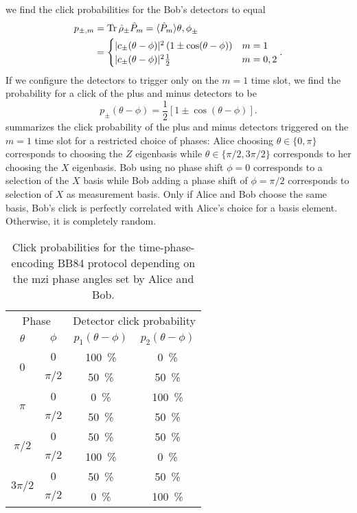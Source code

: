 we find the click probabilities for the Bob's detectors to equal
\begin{equation}
	\begin{split}
		p_{\pm,m}
		&=
		\operatorname{Tr}{\hat\rho_\pm\hat{P}_m}
		=
		\langle\hat{P}_m\rangle{\theta,\phi}_{\pm}
		\\
		&=
		\begin{cases}
			\lvert c_\pm(\theta-\phi)\rvert^2\left(1\pm\cos(\theta-\phi)\right) & m=1 \\
			\lvert c_\pm(\theta-\phi)\rvert^2\frac{1}{2} & m=0,2
		\end{cases}
		.
	\end{split}
\end{equation}
If we configure the detectors to trigger only on the $m=1$ time slot, we find the probability for a click of the plus and minus detectors to be
\begin{equation}
	p_\pm(\theta-\phi)
	=
	\frac{1}{2}
	\left[
		1
		\pm
		\cos(\theta-\phi)
	\right]
	.
\end{equation}
 summarizes the click probability of the plus and minus detectors triggered on the $m=1$ time slot for a restricted choice of phases:
Alice choosing $\theta\in\{0,\pi\}$ corresponds to choosing the $Z$ eigenbasis while $\theta\in\{\pi/2,3\pi/2\}$ corresponds to her choosing the $X$ eigenbasis. Bob using no phase shift $\phi=0$ corresponds to a selection of the $X$ basis while Bob adding a phase shift of $\phi=\pi/2$ corresponds to selection of $X$ as measurement basis. Only if Alice and Bob choose the same basis, Bob's click is perfectly correlated with Alice's choice for a basis element. Otherwise, it is completely random.
\begin{table}[htb]
	\centering
	\begin{tabular}{cccc}
		\toprule
		\multicolumn{2}{c}{Phase} & \multicolumn{2}{c}{Detector click probability} \\
		$\theta$ & $\phi$ & $p_1(\theta-\phi)$ & $p_2(\theta-\phi)$ \\
		\midrule
		\multirow{2}{*}{$0$} & $0$ & \SI{100}{\percent} & \SI{0}{\percent} \\
		& $\pi/2$ & \SI{50}{\percent} & \SI{50}{\percent} \\
		\cmidrule{1-1}
		\multirow{2}{*}{$\pi$} & $0$ & \SI{0}{\percent} & \SI{100}{\percent} \\
		& $\pi/2$ & \SI{50}{\percent} & \SI{50}{\percent} \\
		\cmidrule{1-1}
		\multirow{2}{*}{$\pi/2$} & $0$ & \SI{50}{\percent} & \SI{50}{\percent} \\
		& $\pi/2$ & \SI{100}{\percent} & \SI{0}{\percent} \\
		\cmidrule{1-1}
		\multirow{2}{*}{$3\pi/2$} & $0$ & \SI{50}{\percent} & \SI{50}{\percent} \\
		& $\pi/2$ & \SI{0}{\percent} & \SI{100}{\percent} \\
		\bottomrule
	\end{tabular}
	\caption{Click probabilities for the time-phase-encoding BB84 protocol depending on the \gls{mzi} phase angles set by Alice and Bob.}\label{tab:bb84_time_phase_clicks}
\end{table}
